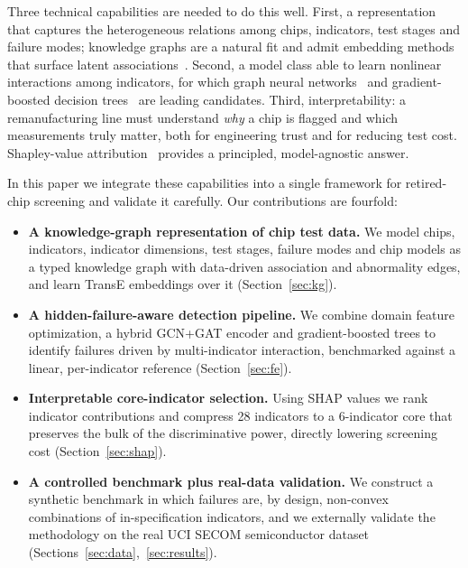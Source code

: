 \documentclass[electronics,article,submit,pdftex,moreauthors]{Definitions/mdpi}
\begin{document}
Three technical capabilities are needed to do this well. First, a representation that captures the heterogeneous relations among chips, indicators, test stages and failure modes; knowledge graphs are a natural fit and admit embedding methods that surface latent associations~\cite{bordes2013translating,ji2022survey}. Second, a model class able to learn nonlinear interactions among indicators, for which graph neural networks~\cite{kipf2017semi,velickovic2018graph,wu2021comprehensive} and gradient-boosted decision trees~\cite{friedman2001greedy,chen2016xgboost} are leading candidates. Third, interpretability: a remanufacturing line must understand \emph{why} a chip is flagged and which measurements truly matter, both for engineering trust and for reducing test cost. Shapley-value attribution~\cite{shapley1953value,lundberg2017unified,lundberg2020local} provides a principled, model-agnostic answer.

In this paper we integrate these capabilities into a single framework for retired-chip screening and validate it carefully. Our contributions are fourfold:
\begin{itemize}
\item \textbf{A knowledge-graph representation of chip test data.} We model chips, indicators, indicator dimensions, test stages, failure modes and chip models as a typed knowledge graph with data-driven association and abnormality edges, and learn TransE embeddings over it (Section~\ref{sec:kg}).
\item \textbf{A hidden-failure-aware detection pipeline.} We combine domain feature optimization, a hybrid GCN+GAT encoder and gradient-boosted trees to identify failures driven by multi-indicator interaction, benchmarked against a linear, per-indicator reference (Section~\ref{sec:fe}).
\item \textbf{Interpretable core-indicator selection.} Using SHAP values we rank indicator contributions and compress 28 indicators to a 6-indicator core that preserves the bulk of the discriminative power, directly lowering screening cost (Section~\ref{sec:shap}).
\item \textbf{A controlled benchmark plus real-data validation.} We construct a synthetic benchmark in which failures are, by design, non-convex combinations of in-specification indicators, and we externally validate the methodology on the real UCI SECOM semiconductor dataset~\cite{mccann2008secom} (Sections~\ref{sec:data},~\ref{sec:results}).
\end{itemize}
\end{document}

